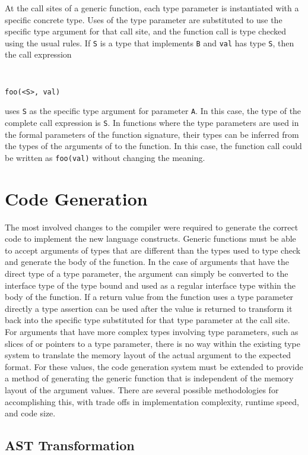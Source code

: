 \documentclass[letterpaper,twocolumn,11pt]{article}
\begin{document}
At the call sites of a generic function, each type parameter is instantiated with a specific concrete type. Uses of the type parameter are substituted to use the specific type argument for that call site, and the function call is type checked using the usual rules. If \texttt{S} is a type that implements \texttt{B} and \texttt{val} has type \texttt{S}, then the call expression
{ \tt \small
\begin{verbatim}
foo(<S>, val)
\end{verbatim}
}
uses \texttt{S} as the specific type argument for parameter \texttt{A}. In this case, the type of the complete call expression is \texttt{S}. In functions where the type parameters are used in the formal parameters of the function signature, their types can be inferred from the types of the arguments of to the function. In this case, the function call could be written as \texttt{foo(val)} without changing the meaning.

\section{Code Generation} \label{code_generation}

The most involved changes to the compiler were required to generate the correct code to implement the new language constructs. Generic functions must be able to accept arguments of types that are different than the types used to type check and generate the body of the function. In the case of arguments that have the direct type of a type parameter, the argument can simply be converted to the interface type of the type bound and used as a regular interface type within the body of the function. If a return value from the function uses a type parameter directly a type assertion can be used after the value is returned to transform it back into the specific type substituted for that type parameter at the call site. For arguments that have more complex types involving type parameters, such as slices of or pointers to a type parameter, there is no way within the existing type system to translate the memory layout of the actual argument to the expected format. For these values, the code generation system must be extended to provide a method of generating the generic function that is independent of the memory layout of the argument values. There are several possible methodologies for accomplishing this, with trade offs in implementation complexity, runtime speed, and code size. 

\subsection{AST Transformation} \label{ast_transformation}
\end{document}
